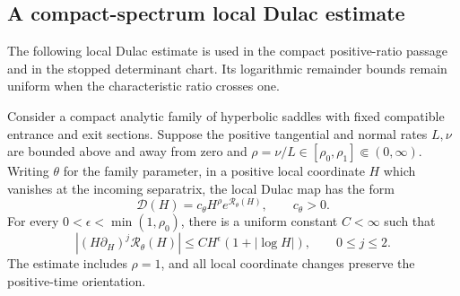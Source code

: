 \subsection{A compact-spectrum local Dulac estimate}

The following local Dulac estimate is used in the compact positive-ratio
passage and in the stopped determinant chart. Its logarithmic remainder
bounds remain uniform when the characteristic ratio crosses one.

\begin{lemma}
\label{lem:uniform-positive-dulac}
Consider a compact analytic family of hyperbolic saddles with fixed compatible
entrance and exit sections.  Suppose the positive tangential and normal rates
\(L,\nu\) are bounded above and away from zero and
\mbox{\(\rho=\nu/L\in[\rho_0,\rho_1]\Subset(0,\infty)\)}. Writing \(\theta\) for
the family parameter, in a positive local coordinate \(H\) which vanishes at
the incoming separatrix, the local Dulac map has the form
\[
 \mathcal D(H)=c_\theta H^\rho e^{\mathcal R_\theta(H)},
 \qquad c_\theta>0.
\]
For every \(0<\epsilon<\min(1,\rho_0)\), there is a uniform constant
\(C<\infty\) such that
\[
 \left|(H\partial_H)^j\mathcal R_\theta(H)\right|
 \le C H^\epsilon(1+|\log H|),
 \qquad 0\le j\le2.
\]
The estimate includes \(\rho=1\), and all local coordinate changes preserve
the positive-time orientation.
\end{lemma}

